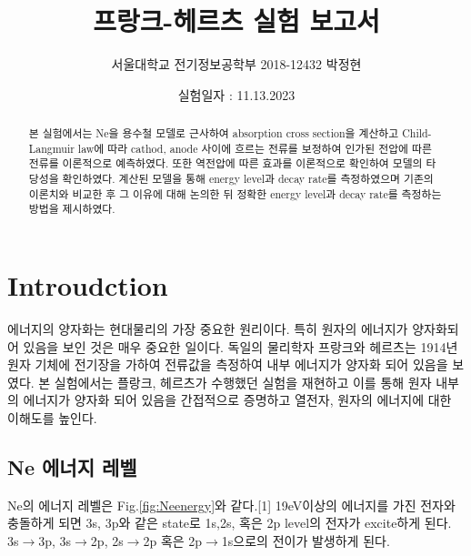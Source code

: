 \documentclass[%
 reprint,
 amsmath,amssymb,
 aps,
]{revtex4-2}
\begin{document}
\title{프랑크-헤르츠 실험 보고서}

\author{서울대학교 전기정보공학부 2018-12432 박정현}
\date{실험일자 : 11.13.2023}%

\begin{abstract}
본 실험에서는 Ne을 용수철 모델로 근사하여 absorption cross section을 계산하고 Child-Langmuir law에 따라 cathod, anode 사이에 흐르는 전류를 보정하여 인가된 전압에 따른 전류를 이론적으로 예측하였다. 또한 역전압에 따른 효과를 이론적으로 확인하여 모델의 타당성을 확인하였다. 계산된 모델을 통해 energy level과 decay rate를 측정하였으며 기존의 이론치와 비교한 후 그 이유에 대해 논의한 뒤 정확한 energy level과 decay rate를 측정하는 방법을 제시하였다.
\end{abstract}

\maketitle


\section{Introudction}
에너지의 양자화는 현대물리의 가장 중요한 원리이다. 특히 원자의 에너지가 양자화되어 있음을 보인 것은 매우 중요한 일이다. 독일의 물리학자 프랑크와 헤르츠는 1914년 원자 기체에 전기장을 가하여 전류값을 측정하여 내부 에너지가 양자화 되어 있음을 보였다. 본 실험에서는 플랑크, 헤르츠가 수행했던 실험을 재현하고 이를 통해 원자 내부의 에너지가 양자화 되어 있음을 간접적으로 증명하고 열전자, 원자의 에너지에 대한 이해도를 높인다.

\subsection{Ne 에너지 레벨}
Ne의 에너지 레벨은 Fig.\ref{fig:Neenergy}와 같다.[1] 19eV이상의 에너지를 가진 전자와 충돌하게 되면 3s, 3p와 같은 state로 1s,2s, 혹은 2p level의 전자가 excite하게 된다. 3s$\rightarrow$3p, 3s$\rightarrow$2p, 2s$\rightarrow$2p 혹은 2p$\rightarrow$1s으로의 전이가 발생하게 된다.
\end{document}
